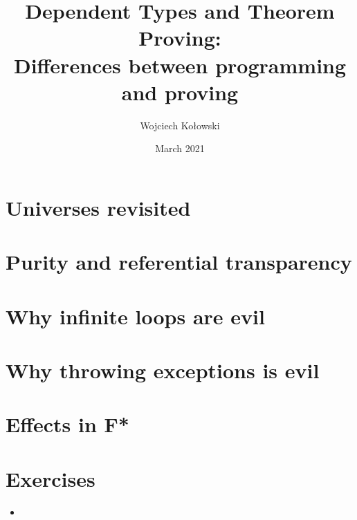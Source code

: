 \documentclass{beamer}
\title{Dependent Types and Theorem Proving: \\Differences between programming and proving}
\author{Wojciech Kołowski}
\date{March 2021}
\begin{document}
\frame{\titlepage}
\frame{\tableofcontents}

\section{Universes revisited}

\section{Purity and referential transparency}

\section{Why infinite loops are evil}
\section{Why throwing exceptions is evil}
\section{Effects in F*}
\section{Exercises}
	
\begin{frame}{}
\begin{itemize}
	\item 
\end{itemize}
\end{frame}
\end{document}
